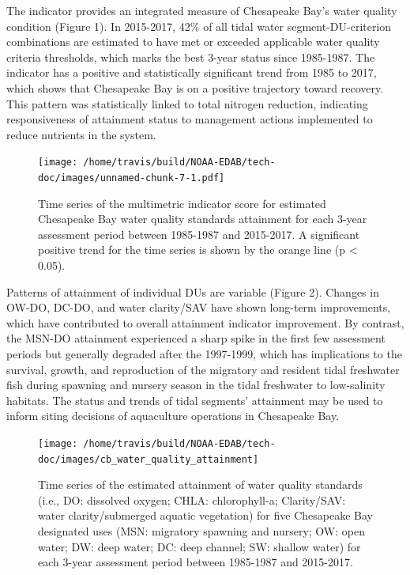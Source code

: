 \documentclass[
]{book}
\begin{document}
The indicator provides an integrated measure of Chesapeake Bay's water quality condition (Figure 1). In 2015-2017, 42\% of all tidal water segment-DU-criterion combinations are estimated to have met or exceeded applicable water quality criteria thresholds, which marks the best 3-year status since 1985-1987. The indicator has a positive and statistically significant trend from 1985 to 2017, which shows that Chesapeake Bay is on a positive trajectory toward recovery. This pattern was statistically linked to total nitrogen reduction, indicating responsiveness of attainment status to management actions implemented to reduce nutrients in the system.

\begin{figure}
\centering
\texttt{[image: /home/travis/build/NOAA-EDAB/tech-doc/images/unnamed-chunk-7-1.pdf]}
\caption{\label{fig:unnamed-chunk-7}Time series of the multimetric indicator score for estimated Chesapeake Bay water quality standards attainment for each 3-year assessment period between 1985-1987 and 2015-2017. A significant positive trend for the time series is shown by the orange line (p \textless{} 0.05).}
\end{figure}

Patterns of attainment of individual DUs are variable (Figure 2). Changes in OW-DO, DC-DO, and water clarity/SAV have shown long-term improvements, which have contributed to overall attainment indicator improvement. By contrast, the MSN-DO attainment experienced a sharp spike in the first few assessment periods but generally degraded after the 1997-1999, which has implications to the survival, growth, and reproduction of the migratory and resident tidal freshwater fish during spawning and nursery season in the tidal freshwater to low-salinity habitats. The status and trends of tidal segments' attainment may be used to inform siting decisions of aquaculture operations in Chesapeake Bay.

\begin{figure}
\texttt{[image: /home/travis/build/NOAA-EDAB/tech-doc/images/cb\_water\_quality\_attainment]} \caption{Time series of the estimated attainment of water quality standards (i.e., DO: dissolved oxygen; CHLA: chlorophyll-a; Clarity/SAV: water clarity/submerged aquatic vegetation) for five Chesapeake Bay designated uses (MSN: migratory spawning and nursery; OW: open water; DW: deep water; DC: deep channel; SW: shallow water) for each 3-year assessment period between 1985-1987 and 2015-2017.}\label{fig:unnamed-chunk-8}
\end{figure}
\end{document}
